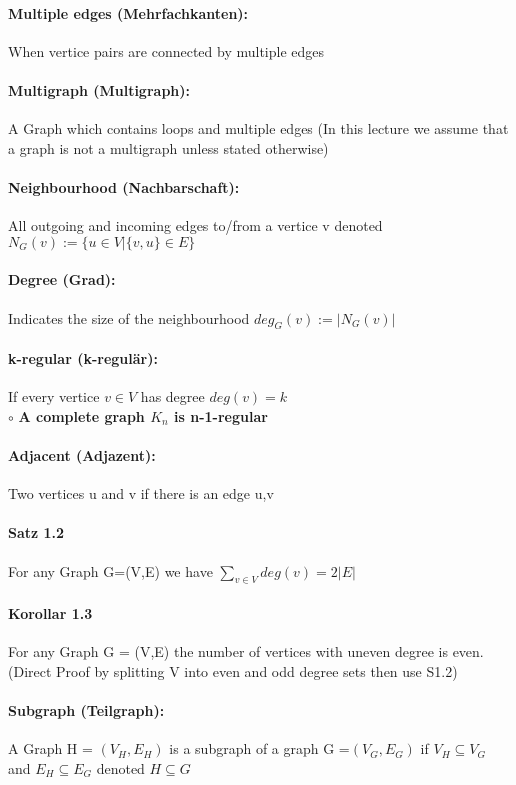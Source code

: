 \documentclass[8pt]{extreport}
\begin{document}
\paragraph{Multiple edges (Mehrfachkanten):} When vertice pairs are connected by multiple edges
\paragraph{Multigraph (Multigraph):} A Graph which contains loops and multiple edges (In this lecture we assume that a graph is not a multigraph unless stated otherwise)
\paragraph{Neighbourhood (Nachbarschaft):} All outgoing and incoming edges to/from a vertice v denoted $N_{G}(v):= \{u \in V |\{v,u\} \in E\}$
\paragraph{Degree (Grad):} Indicates the size of the neighbourhood $deg_{G}(v):= |N_{G}(v)|$
\paragraph{k-regular (k-regulär):} If every vertice $v\in V$ has degree $deg(v) = k$\\
 $\circ$ \textbf{A complete graph $K_{n}$ is n-1-regular}	
\paragraph{Adjacent (Adjazent):} Two vertices u and v if there is an edge {u,v}

\paragraph{Satz 1.2} For any Graph G=(V,E) we have $\sum_{ v\in V}deg(v) = 2|E|$
\paragraph{Korollar 1.3} For any Graph G = (V,E) the number of vertices with uneven degree is even. (Direct Proof by splitting V into even and odd degree sets then use S1.2)
\paragraph{Subgraph (Teilgraph):} A Graph H = $(V_{H},E_{H})$ is a subgraph of a graph G =$(V_{G},E_{G})$ if $V_{H} \subseteq V_{G}$ and $E_{H} \subseteq E_{G}$ denoted $H \subseteq G$
\end{document}
